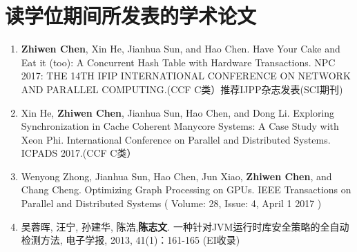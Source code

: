 \chapter{读学位期间所发表的学术论文}

\begin{enumerate}
\item \textbf{Zhiwen Chen}, Xin He, Jianhua Sun, and Hao Chen. Have Your Cake and Eat it (too): A Concurrent Hash Table with Hardware Transactions. NPC 2017: THE 14TH IFIP INTERNATIONAL CONFERENCE ON NETWORK AND PARALLEL COMPUTING.(CCF C类）推荐IJPP杂志发表(SCI期刊)
\item Xin He, \textbf{Zhiwen Chen}, Jianhua Sun, Hao Chen, and Dong Li. Exploring Synchronization in Cache Coherent Manycore Systems: A Case Study with Xeon Phi. International Conference on Parallel and Distributed Systems. ICPADS 2017.(CCF C类）
\item Wenyong Zhong, Jianhua Sun, Hao Chen, Jun Xiao, \textbf{Zhiwen Chen}, and Chang Cheng. Optimizing Graph Processing on GPUs. IEEE Transactions on Parallel and Distributed Systems ( Volume: 28, Issue: 4, April 1 2017 ) 
\item 吴蓉晖, 汪宁, 孙建华, 陈浩,\textbf{陈志文}. 一种针对JVM运行时库安全策略的全自动检测方法, 电子学报, 2013, 41(1)：161-165 (EI收录)
\end{enumerate}


